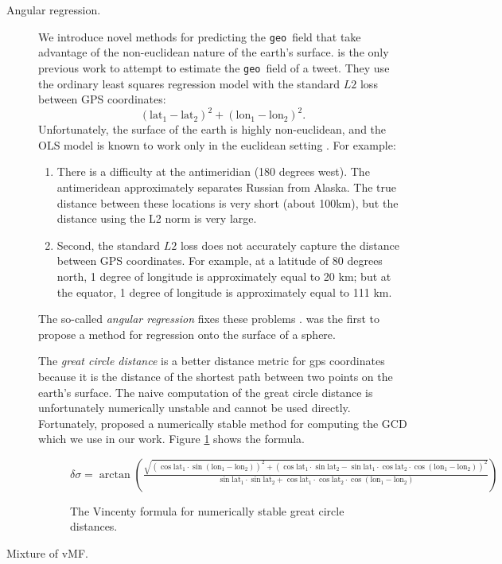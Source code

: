 \documentclass[sigconf,anonymous,review]{acmart}
\newcommand{\tweetdata}[1]{{\texttt{#1}~}}
\newcommand{\geo          }{\tweetdata{geo}}
\newcommand{\lata}{\text{lat}_1}
\newcommand{\latb}{\text{lat}_2}
\newcommand{\latd}{(\lata-\latb)}
\newcommand{\lona}{\text{lon}_1}
\newcommand{\lonb}{\text{lon}_2}
\newcommand{\lond}{(\lona-\lonb)}
\begin{document}
{\begin{description}
\item[Angular regression.]
We introduce novel methods for predicting the \geo field that take advantage of the non-euclidean nature of the earth's surface.
\citet{duong2016near} is the only previous work to attempt to estimate the \geo field of a tweet.
They use the ordinary least squares regression model with the standard $L2$ loss between GPS coordinates:
\begin{equation}
    \latd^2 + \lond^2
    .
\end{equation}
Unfortunately, the surface of the earth is highly non-euclidean, 
and the OLS model is known to work only in the euclidean setting \citep[e.g.][]{fisher1992regression}.
For example:
\begin{enumerate}
    \item
        There is a difficulty at the antimeridian (180 degrees west).
        The antimeridean approximately separates Russian from Alaska.
        The true distance between these locations is very short (about 100km),
        but the distance using the L2 norm is very large.
    \item
        Second, the standard $L2$ loss does not accurately capture the distance between GPS coordinates.
        For example, at a latitude of 80 degrees north, 1 degree of longitude is approximately equal to 20 km;
        but at the equator, 1 degree of longitude is approximately equal to 111 km.
\end{enumerate}

The so-called \emph{angular regression} fixes these problems \citep{fisher1992regression}.
\citet{fisher1992regression} was the first to propose a method for regression onto the surface of a sphere.

The \emph{great circle distance} is a better distance metric for gps coordinates because it is the distance of the shortest path between two points on the earth's surface.
The naive computation of the great circle distance is unfortunately numerically unstable and cannot be used directly.
Fortunately, \citet{vincenty1975direct} proposed a numerically stable method for computing the GCD which we use in our work.
Figure \ref{fig:vincenty} shows the formula.

\begin{figure}
    \centering
    $
    \displaystyle
        \delta\sigma 
        =
        \arctan\left(
            \frac
            {\sqrt{(\cos\lata\cdot\sin\lond)^2 + (\cos\lata\cdot\sin\latb-\sin\lata\cdot\cos\latb\cdot\cos\lond)^2}}
            {\sin\lata\cdot\sin\latb + \cos\lata\cdot\cos\latb\cdot\cos\lond}
        \right)
    $
    \caption{The Vincenty formula for numerically stable great circle distances.}
    \label{fig:vincenty}
\end{figure}

\item[Mixture of vMF.]

\end{description}
}
\end{document}
